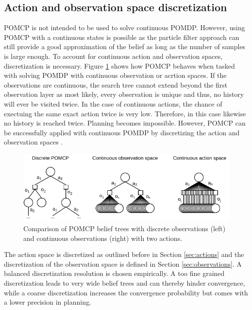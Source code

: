\subsection{Action and observation space discretization}
\label{sec:discretization}

POMCP is not intended to be used to solve continuous POMDP. However, using POMCP with a continuous states is possible as the particle filter approach can still provide a good approximation of the belief as long as the number of samples is large enough. To account for continuous action and observation spaces, discretization is necessary. Figure \ref{fig:pomcp_cont} shows how POMCP behaves when tasked with solving POMDP with continuous observation or acrtion spaces. If the observations are continuous, the search tree cannot extend beyond the first observation layer as most likely, every observation is unique and thus, no history will ever be visited twice. In the case of continuous actions, the chance of exectuing the same exact action twice is very low. Therefore, in this case likewise no history is reached twice. Planning becomes impossible. However, POMCP can be successfully applied with continuous POMDP by discretizing the action and observation spaces \parencite{pomcp_continuous}.

\begin{figure}[htbp]
    \centering
    \includegraphics[width=1.0\textwidth]{figures/pomcp_continuous.pdf}
    \caption[Comparison of POMCP belief trees with discrete observations and continuous observations]{Comparison of POMCP belief trees with discrete observations (left) and continuous observations (right) with two actions.}
    \label{fig:pomcp_cont}
\end{figure}

The action space is discretized as outlined before in Section \ref{sec:actions} and the discretization of the observation space is defined in Section \ref{sec:observations}. A balanced discretization resolution is chosen empirically. A too fine grained discretization leads to very wide belief trees and can thereby hinder convergence, while a coarse discretization increases the convergence probability but comes with a lower precision in planning.


